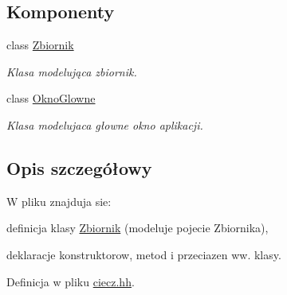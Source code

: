 \subsection*{Komponenty}
\begin{DoxyCompactItemize}
\item 
class \hyperlink{class_zbiornik}{Zbiornik}
\begin{DoxyCompactList}\small\item\em Klasa modelująca zbiornik. \end{DoxyCompactList}\item 
class \hyperlink{class_okno_glowne}{Okno\-Glowne}
\begin{DoxyCompactList}\small\item\em Klasa modelujaca głowne okno aplikacji. \end{DoxyCompactList}\end{DoxyCompactItemize}


\subsection{Opis szczegółowy}
W pliku znajduja sie\-:
\begin{DoxyItemize}
\item definicja klasy \hyperlink{class_zbiornik}{Zbiornik} (modeluje pojecie Zbiornika),
\item deklaracje konstruktorow, metod i przeciazen ww. klasy. 
\end{DoxyItemize}

Definicja w pliku \hyperlink{ciecz_8hh_source}{ciecz.\-hh}.

